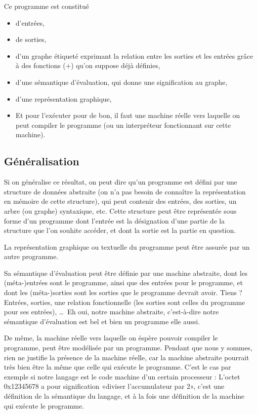 \documentclass{article}
\begin{document}
Ce programme est constitué
\begin{itemize}
\item d'entrées,
\item de sorties,
\item d'un graphe étiqueté exprimant la relation entre les sorties et les entrées grâce à des fonctions ($+$) qu'on suppose déjà définies,
\item d'une sémantique d'évaluation, qui donne une signification au graphe,
\item d'une représentation graphique,
\item Et pour l'exécuter pour de bon, il faut une machine réelle vers laquelle on peut compiler le programme (ou un interpréteur fonctionnant sur cette machine).
\end{itemize}

\subsection{Généralisation}
Si on généralise ce résultat, on peut dire qu'un programme est défini par une structure de données abstraite (on n'a pas besoin de connaître la représentation en mémoire de cette structure), qui peut contenir des entrées, des sorties, un arbre (ou graphe) syntaxique, etc. Cette structure peut être représentée sous forme d'un programme dont l'entrée est la désignation d'une partie de la structure que l'on souhite accéder, et dont la sortie est la partie en question.

La représentation graphique ou textuelle du programme peut être assurée par un autre programme.

Sa sémantique d'évaluation peut être définie par une machine abstraite, dont les (méta-)entrées sont le programme, ainsi que des entrées pour le programme, et dont les (méta-)sorties sont les sorties que le programme devrait avoir. Tiens ? Entrées, sorties, une relation fonctionnelle (les sorties sont celles du programme pour ses entrées), \dots\ Eh oui, notre machine abstraite, c'est-à-dire notre sémantique d'évaluation est bel et bien un programme elle aussi.

De même, la machine réelle vers laquelle on éspère pouvoir compiler le programme, peut être modélisée par un programme. Pendant que nous y sommes, rien ne justifie la présence de la machine réelle, car la machine abstraite pourrait très bien être la même que celle qui exécute le programme. C'est le cas par exemple si notre langage est le code machine d'un certain processeur : L'octet 0x12345678 a pour signification «diviser l'accumulateur par 2», c'est une définition de la sémantique du langage, et à la fois une définition de la machine qui exécute le programme.
\end{document}
